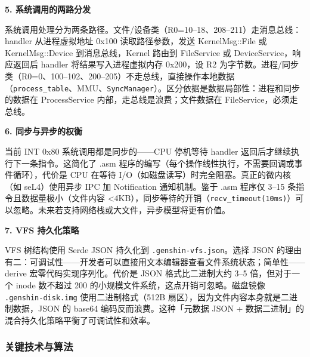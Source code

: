 \documentclass[UTF8,a4paper,12pt]{ctexart}
\begin{document}
\textbf{5. 系统调用的两路分发}

系统调用处理分为两条路径。文件/设备类（R0=10--18、208--211）走消息总线：handler 从进程虚拟地址 0x100 读取路径参数，发送 KernelMsg::File 或 KernelMsg::Device 到消息总线，Kernel 路由到 FileService 或 DeviceService，响应返回后 handler 将结果写入进程虚拟内存 0x200，设 R2 为字节数。进程/同步类（R0=0、100--102、200--205）不走总线，直接操作本地数据（\texttt{process\_table}、MMU、\texttt{SyncManager}）。区分依据是数据局部性：进程和同步的数据在 ProcessService 内部，走总线是浪费；文件数据在 FileService，必须走总线。

\textbf{6. 同步与异步的权衡}

当前 INT 0x80 系统调用都是同步的——CPU 停机等待 handler 返回后才继续执行下一条指令。这简化了 .asm 程序的编写（每个操作线性执行，不需要回调或事件循环），代价是 CPU 在等待 I/O（如磁盘读写）时完全阻塞。真正的微内核（如 seL4）使用异步 IPC 加 Notification 通知机制。鉴于 .asm 程序仅 3--15 条指令且数据量极小（文件内容 <4KB），同步等待的开销（\texttt{recv\_timeout(10ms)}）可以忽略。未来若支持网络栈或大文件，异步模型将更有价值。

\textbf{7. VFS 持久化策略}

VFS 树结构使用 Serde JSON 持久化到 \texttt{.genshin-vfs.json}。选择 JSON 的理由有二：可调试性——开发者可以直接用文本编辑器查看文件系统状态；简单性——derive 宏零代码实现序列化。代价是 JSON 格式比二进制大约 3--5 倍，但对于一个 inode 数不超过 200 的小规模文件系统，这点开销可忽略。磁盘镜像 \texttt{.genshin-disk.img} 使用二进制格式（512B 扇区），因为文件内容本身就是二进制数据，JSON 的 base64 编码反而浪费。这种「元数据 JSON + 数据二进制」的混合持久化策略平衡了可调试性和效率。
\subsubsection{关键技术与算法}
\end{document}
